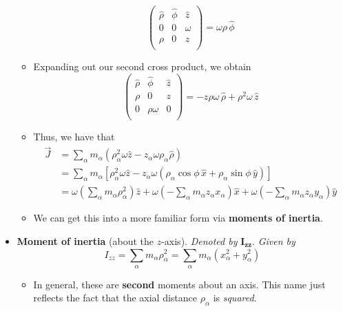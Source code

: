 \documentclass[../notes.tex]{subfiles}
\begin{document}
\begin{itemize}
\begin{itemize}
\begin{equation*}
\begin{pmatrix}
                \hat{\rho} & \hat{\phi} & \hat{z}\\
                0 & 0 & \omega\\
                \rho & 0 & z\\
            \end{pmatrix}
            = \omega\rho\,\hat{\phi}
        \end{equation*}
        \item Expanding out our second cross product, we obtain
        \begin{equation*}
            \begin{pmatrix}
                \hat{\rho} & \hat{\phi} & \hat{z}\\
                \rho & 0 & z\\
                0 & \rho\omega & 0\\
            \end{pmatrix}
            = -z\rho\omega\,\hat{\rho}+\rho^2\omega\,\hat{z}
        \end{equation*}
        \item Thus, we have that
        \begin{align*}
            \vec{J} &= \sum_\alpha m_\alpha(\rho_\alpha^2\omega\hat{z}-z_\alpha\omega\rho_\alpha\hat{\rho})\\
            &= \sum_\alpha m_\alpha[\rho_\alpha^2\omega\hat{z}-z_\alpha\omega(\rho_\alpha\cos\phi\,\hat{x}+\rho_\alpha\sin\phi\,\hat{y})]\\
            &= \omega\left( \sum_\alpha m_\alpha\rho_\alpha^2 \right)\hat{z}+\omega\left( -\sum_\alpha m_\alpha z_\alpha x_\alpha \right)\hat{x}+\omega\left( -\sum_\alpha m_\alpha z_\alpha y_\alpha \right)\hat{y}
        \end{align*}
        \item We can get this into a more familiar form via \textbf{moments of inertia}.
    \end{itemize}
    \pagebreak
    \item \textbf{Moment of inertia} (about the $z$-axis). \emph{Denoted by} $\bm{I_{zz}}$. \emph{Given by}
    \begin{equation*}
        I_{zz} = \sum_\alpha m_\alpha\rho_\alpha^2
        = \sum_\alpha m_\alpha(x_\alpha^2+y_\alpha^2)
    \end{equation*}
    \begin{itemize}
        \item In general, these are \textbf{second} moments about an axis. This name just reflects the fact that the axial distance $\rho_\alpha$ is \emph{squared}.

\end{itemize}
\end{itemize}
\end{document}

